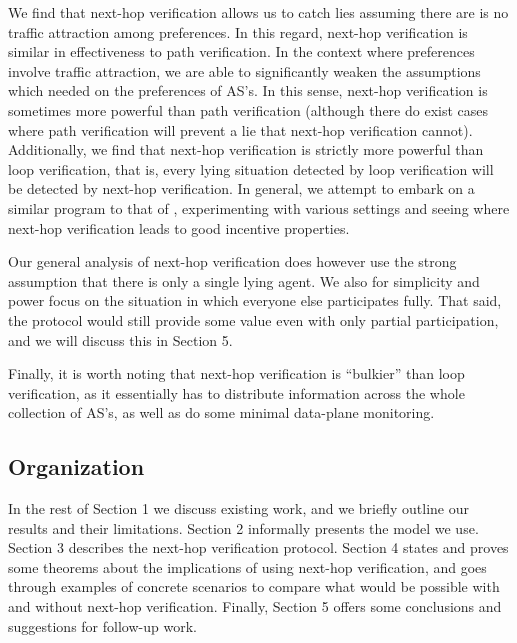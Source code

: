 \documentclass[10pt]{article}
\begin{document}
    We find that next-hop verification allows us to catch lies assuming
    there are is no traffic attraction among preferences.
    In this regard, next-hop verification is similar in effectiveness to 
    path verification.
    In the context where preferences involve traffic attraction,
    we are able to significantly weaken the assumptions which
    \cite{Attraction} needed on the preferences of AS's.
    In this sense, next-hop verification is sometimes more powerful
    than path verification (although there do exist cases where
    path verification will prevent a lie that next-hop verification cannot).
    Additionally, we find that next-hop verification is strictly more
    powerful than loop verification, that is, every lying situation detected
    by loop verification will be detected by next-hop verification.
    In general, we attempt to embark on a similar program to that of
    \cite{Attraction}, experimenting with various settings and seeing
    where next-hop verification leads to good incentive properties.

    Our general analysis of next-hop verification does however use the strong
    assumption that there is only a single lying agent.
    We also for simplicity
    and power focus on the situation in which everyone else participates fully.
    That said, the protocol would still provide some value even with only
    partial participation, and we will discuss this in Section 5. 

    Finally, it is worth noting that next-hop verification is ``bulkier'' than loop
    verification, as it essentially has to distribute information across the
    whole collection of AS's, as well as do some minimal data-plane monitoring.

  \subsection{Organization}
    In the rest of Section 1 we discuss existing work, and we briefly outline
    our results and their limitations. Section 2 informally presents the model
    we use. Section 3 describes the next-hop verification protocol. Section 4
    states and proves some theorems about the implications of using next-hop
    verification, and goes through examples of concrete scenarios to compare
    what would be possible with and without next-hop verification. Finally,
    Section 5 offers some conclusions and suggestions for follow-up work.
\end{document}
